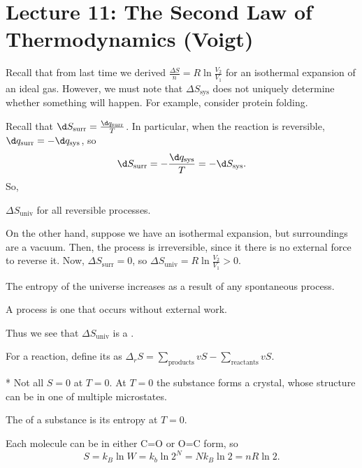 \section*{Lecture 11: The Second Law of Thermodynamics (Voigt)}
\setcounter{section}{11}

Recall that from last time we derived $\frac{\Delta S}{n} = R\ln \frac{V_2}{V_1}$ for an isothermal expansion of an ideal gas.
However, we must note that $\Delta S_{\text{sys}}$ does not uniquely determine whether something will happen. 
For example, consider protein folding.

Recall that $\d S_{\text{surr}} = \frac{\d q_{\text{surr}}}{T}$.
In particular, when the reaction is reversible, $\d q_{\text{surr}} = - \d q_{\text{sys}}$, so \[
	\d S_{\text{surr}} = -\frac{\d q_{\text{sys}}}{T} = - \d S_{\text{sys}}.
\]
So, 
\begin{fact}
	$\Delta S_{\text{univ}}$ for all reversible processes.
\end{fact}

On the other hand, suppose we have an isothermal expansion, but surroundings are a vacuum. Then, the process is irreversible, since it there is no external force to reverse it. Now, $\Delta S_{\text{surr}} = 0$, so $\Delta S_{\text{univ}} = R \ln \frac{V_2}{V_1} > 0$.

\begin{law}
	The entropy of the universe increases as a result of any spontaneous process.
\end{law}	

\begin{defn}
	A  process is one that occurs without external work.
\end{defn}

Thus we see that $\Delta S_{\text{univ}}$ is a .

\begin{defn}
	For a reaction, define its  as $\Delta_r S = \sum\limits_{\text{products}} v S - \sum\limits_{\text{reactants}} v S$.
\end{defn}

\begin{fact}*
	Not all $S = 0$ at $T = 0$. At $T = 0$ the substance forms a crystal, whose structure can be in one of multiple microstates. 
\end{fact}

\begin{defn}
	The  of a substance is its entropy at $T = 0$.
\end{defn}

\begin{exm}
	Each molecule can be in either C=O or O=C form, so \[
		S = k_B \ln W = k_b \ln 2^{N} = Nk_B \ln 2 = nR \ln 2.
	\]
\end{exm}


